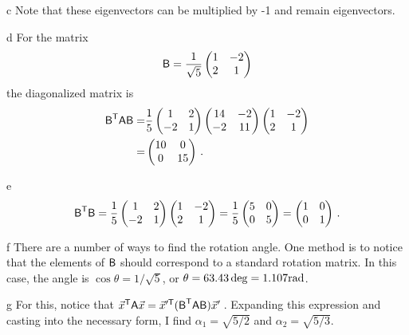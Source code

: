 \documentclass[]{homework}
\begin{document}
\begin{problem}{1}
\begin{subproblem}{c}
    Note that these eigenvectors can be multiplied by -1 and remain eigenvectors.
  \end{subproblem}
  \begin{subproblem}{d}
    For the matrix
    \[ \textsf B = \frac{1}{\sqrt{5}} \begin{pmatrix} 1 & -2 \\ 2 & 1 \end{pmatrix} \]
    the diagonalized matrix is
    \begin{align*}
      { \textsf B}^{\textsf T} \textsf A \textsf B = &
        \frac{1}{5} \begin{pmatrix} 1 & 2 \\ -2 & 1 \end{pmatrix} \begin{pmatrix} 14 & -2 \\ -2 & 11 \end{pmatrix} \begin{pmatrix} 1 & -2 \\ 2 & 1 \end{pmatrix} \\
      = & \begin{pmatrix} 10 & 0 \\ 0 & 15 \end{pmatrix}\,.
    \end{align*}
  \end{subproblem}
  \begin{subproblem}{e}
    \begin{equation}
    { \textsf B}^{\textsf T} \textsf B =
      \frac{1}{5} \begin{pmatrix} 1 & 2 \\ -2 & 1 \end{pmatrix} \begin{pmatrix} 1 & -2 \\ 2 & 1 \end{pmatrix}
      = \frac{1}{5} \begin{pmatrix} 5 & 0 \\ 0 & 5 \end{pmatrix}
      = \begin{pmatrix} 1 & 0 \\ 0 & 1 \end{pmatrix}\,.\nonumber
    \end{equation}
  \end{subproblem}
  \begin{subproblem}{f}
    There are a number of ways to  find the rotation angle.
    One method is to notice that the elements of $\textsf B$ should
    correspond to a standard rotation matrix.
    In this case, the angle is $\cos \theta = 1/\sqrt{5}$, or
    $\theta = 63.43\deg = 1.107 {\rm rad}$.
  \end{subproblem}
  \begin{subproblem}{g}
    For this, notice that ${\vec{x}}^{\textsf T} \textsf A \vec{x} = {\vec{x}}^{\prime \textsf T} ({\textsf B}^{\textsf T}\textsf A\textsf B) \vec{x}'$\,.
    Expanding this expression and casting into the necessary form,
    I find $\alpha_1 = \sqrt{5/2}$ and $\alpha_2 = \sqrt{5/3}$.
  \end{subproblem}


\end{problem}
\end{document}
